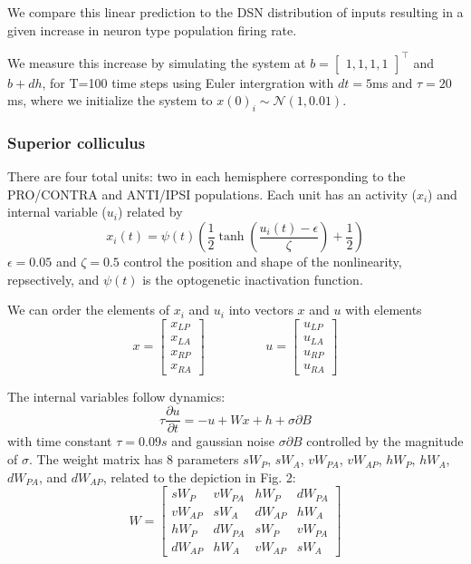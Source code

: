 \documentclass[11pt]{article}
\begin{document}
We compare this linear prediction to the DSN distribution of inputs resulting in a given increase in neuron type population firing rate.

We measure this increase by simulating the system at $b = \begin{bmatrix} 1,1,1,1 \end{bmatrix}^\top$ and $b + dh$, for T=100 time steps using Euler intergration with $dt = 5$ms and $\tau = 20$ms, where we initialize the system to $x(0)_i \sim \mathcal{N}(1, 0.01)$.



\subsubsection{Superior colliculus}
There are four total units: two in each hemisphere corresponding to the PRO/CONTRA and ANTI/IPSI populations.  Each unit has an activity ($x_i$) and internal variable ($u_i$) related by
\begin{equation}
x_i(t) =\psi(t)\left(\frac{1}{2}\tanh\left(\frac{u_i(t) - \epsilon}{\zeta}\right)+ \frac{1}{2} \right)
\end{equation}
$\epsilon = 0.05$ and $\zeta = 0.5$ control the position and shape of the nonlinearity, repsectively, and $\psi(t)$ is the optogenetic inactivation function.

We can order the elements of $x_i$ and $u_i$ into vectors $x$ and $u$ with elements
\begin{equation}
x = \begin{bmatrix} x_{LP} \\ x_{LA} \\ x_{RP} \\ x_{RA} \end{bmatrix} \hspace{2cm} u = \begin{bmatrix} u_{LP} \\ u_{LA} \\ u_{RP} \\ u_{RA} \end{bmatrix}
\end{equation}

 The internal variables follow dynamics:
\begin{equation}
\tau \frac{\partial u}{\partial t} = -u + Wx + h + \sigma \partial B
\end{equation}
with time constant $\tau = 0.09s$ and gaussian noise $\sigma \partial B$ controlled by the magnitude of $\sigma$.  The weight matrix has 8 parameters $sW_P$, $sW_A$, $vW_{PA}$, $vW_{AP}$, $hW_P$, $hW_A$, $dW_{PA}$, and $dW_{AP}$,  related to the depiction in Fig. 2:
\begin{equation}
W = \begin{bmatrix} sW_P & vW_{PA} & hW_P & dW_{PA}  \\ vW_{AP}  & sW_A & dW_{AP}  & hW_A \\ hW_P & dW_{PA}  & sW_P & vW_{PA}  \\ dW_{AP}  & hW_A & vW_{AP}  & sW_A \end{bmatrix}
\end{equation}
\end{document}
